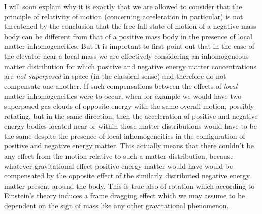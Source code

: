 \documentclass[notitlepage,12pt]{report}
\begin{document}
I will soon explain why it is exactly that we are allowed to consider that the principle of relativity of motion (concerning acceleration in particular) is not threatened by the conclusion that the free fall state of motion of a negative mass body can be different from that of a positive mass body in the presence of local matter inhomogeneities. But it is important to first point out that in the case of the elevator near a local mass we are effectively considering an inhomogeneous matter distribution for which positive and negative energy matter concentrations are \textit{not superposed} in space (in the classical sense) and therefore do not compensate one another. If such compensations between the effects of \textit{local} matter inhomogeneities were to occur, when for example we would have two superposed gas clouds of opposite energy with the same overall motion, possibly rotating, but in the same direction, then the acceleration of positive and negative energy bodies located near or within those matter distributions would have to be the same despite the presence of local inhomogeneities in the configuration of positive and negative energy matter. This actually means that there couldn't be any effect from the motion relative to such a matter distribution, because whatever gravitational effect positive energy matter would have would be compensated by the opposite effect of the similarly distributed negative energy matter present around the body. This is true also of rotation which according to Einstein's theory induces a frame dragging effect which we may assume to be dependent on the sign of mass like any other gravitational phenomenon.
\end{document}
